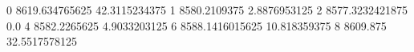 0 8619.634765625 42.3115234375
1 8580.2109375 2.8876953125
2 8577.3232421875 0.0
4 8582.2265625 4.9033203125
6 8588.1416015625 10.818359375
8 8609.875 32.5517578125
